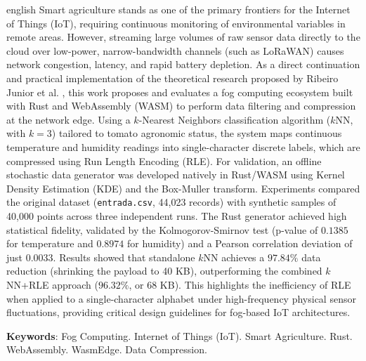 \documentclass[
	12pt,
	openright,
	oneside,
	a4paper,
	english,
	brazil
	]{abntex2}
\begin{document}
\begin{resumo}[Abstract]
\begin{otherlanguage*}{english}
Smart agriculture stands as one of the primary frontiers for the Internet of Things (IoT), requiring continuous monitoring of environmental variables in remote areas. However, streaming large volumes of raw sensor data directly to the cloud over low-power, narrow-bandwidth channels (such as LoRaWAN) causes network congestion, latency, and rapid battery depletion. As a direct continuation and practical implementation of the theoretical research proposed by Ribeiro Junior et al. \cite{ribeiro2020nearest}, this work proposes and evaluates a fog computing ecosystem built with Rust and WebAssembly (WASM) to perform data filtering and compression at the network edge. Using a $k$-Nearest Neighbors classification algorithm ($k$NN, with $k=3$) tailored to tomato agronomic status, the system maps continuous temperature and humidity readings into single-character discrete labels, which are compressed using Run Length Encoding (RLE). For validation, an offline stochastic data generator was developed natively in Rust/WASM using Kernel Density Estimation (KDE) and the Box-Muller transform. Experiments compared the original dataset (\texttt{entrada.csv}, 44,023 records) with synthetic samples of 40,000 points across three independent runs. The Rust generator achieved high statistical fidelity, validated by the Kolmogorov-Smirnov test (p-value of $0.1385$ for temperature and $0.8974$ for humidity) and a Pearson correlation deviation of just $0.0033$. Results showed that standalone $k$NN achieves a $97.84\%$ data reduction (shrinking the payload to 40 KB), outperforming the combined $k$NN+RLE approach ($96.32\%$, or 68 KB). This highlights the inefficiency of RLE when applied to a single-character alphabet under high-frequency physical sensor fluctuations, providing critical design guidelines for fog-based IoT architectures.

\vspace{\onelineskip}
\noindent
\textbf{Keywords}: Fog Computing. Internet of Things (IoT). Smart Agriculture. Rust. WebAssembly. WasmEdge. Data Compression.
\end{otherlanguage*}
\end{resumo}

\listoffigures*
\cleardoublepage

\listoftables*
\cleardoublepage
\end{document}
